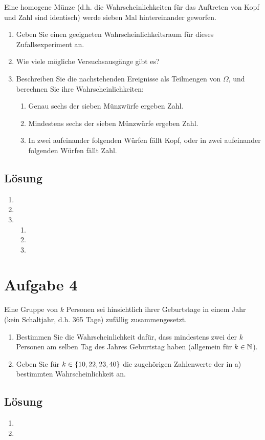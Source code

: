 \documentclass{exercise}
\begin{document}
    \begin{problem}
        Eine homogene Münze (d.h. die Wahrscheinlichkeiten für das Auftreten von Kopf und Zahl sind identisch) werde sieben Mal hintereinander geworfen.
        \begin{enumerate}
            \item Geben Sie einen geeigneten Wahrscheinlichkeitsraum für dieses Zufallsexperiment an.
            \item Wie viele mögliche Versuchsausgänge gibt es?
            \item Beschreiben Sie die nachstehenden Ereignisse als Teilmengen von \(\Omega\), und berechnen Sie ihre Wahrscheinlichkeiten:
            \begin{enumerate}
                \item Genau sechs der sieben Münzwürfe ergeben Zahl.
                \item Mindestens sechs der sieben Münzwürfe ergeben Zahl.
                \item In zwei aufeinander folgenden Würfen fällt Kopf, oder in zwei aufeinander folgenden Würfen fällt Zahl.
            \end{enumerate}
        \end{enumerate}
    \end{problem}

    \subsection*{Lösung}
    \begin{enumerate}
        \item
        \item
        \item
        \begin{enumerate}
            \item
            \item
            \item
        \end{enumerate}
    \end{enumerate}


    \section*{Aufgabe 4}

    \begin{problem}
        Eine Gruppe von \(k\) Personen sei hinsichtlich ihrer Geburtstage in einem Jahr (kein Schaltjahr, d.h. 365 Tage) zufällig zusammengesetzt.
        \begin{enumerate}
            \item Bestimmen Sie die Wahrscheinlichkeit dafür, dass mindestens zwei der \(k\) Personen am selben Tag des Jahres Geburtstag haben (allgemein für \(k \in \N\)).
            \item Geben Sie für \(k \in \braces*{10, 22, 23, 40}\) die zugehörigen Zahlenwerte der in a) bestimmten Wahrscheinlichkeit an.
        \end{enumerate}
    \end{problem}

    \subsection*{Lösung}
    \begin{enumerate}
        \item
        \item
    \end{enumerate}
\end{document}
